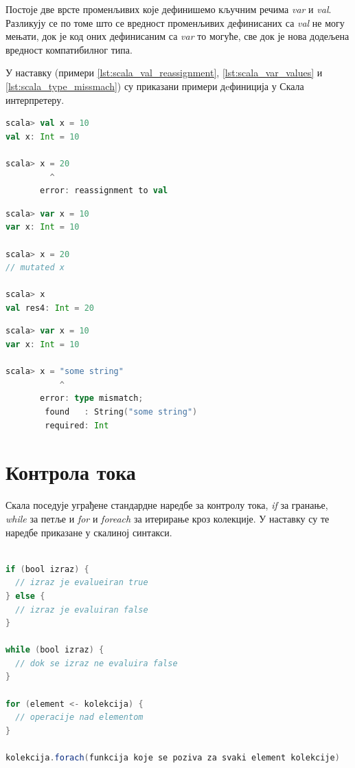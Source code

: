 \documentclass[12pt,oneside]{memoir}
\begin{document}
Постоје две врсте променљивих које дефинишемо кључним речима \textit{var} и \textit{val}. Разликују се по томе што се вредност променљивих дефинисаних са \textit{val} не могу мењати, док је код оних дефинисаним са \textit{var} то могуће, све док је нова додељена вредност компатибилног типа. \cite{scala_prog}

У наставку (примери \ref{lst:scala_val_reassignment}, \ref{lst:scala_var_values} и \ref{lst:scala_type_missmach}) су приказани примери дeфиниција у Скала интерпретеру.

\begin{lstlisting}[language=Scala, caption={Додељивање нове вредности val променљивима}, label={lst:scala_val_reassignment}]
scala> val x = 10
val x: Int = 10

scala> x = 20
         ^
       error: reassignment to val
\end{lstlisting}

\begin{lstlisting}[language=Scala, caption={Додељивање нове вредности var променљивима}, label={lst:scala_var_values}]
scala> var x = 10
var x: Int = 10

scala> x = 20
// mutated x

scala> x
val res4: Int = 20

\end{lstlisting}

\begin{lstlisting}[language=Scala, caption={Додељивање некомпатибилног типа}, label={lst:scala_type_missmach}]
scala> var x = 10
var x: Int = 10

scala> x = "some string"
           ^
       error: type mismatch;
        found   : String("some string")
        required: Int
\end{lstlisting}

\section{Контрола тока}
\label{sec:scala_kontr_toka}

Скала поседује уграђене стандардне наредбе за контролу тока, \textit{if} за гранање, \textit{while} за петље и \textit{for} и \textit{foreach} за итерирање кроз колекције. У наставку су те наредбе приказане у скалиној синтакси. \cite{scala_prog}

\begin{lstlisting}[language=Scala, caption={Контрола тока}, label={lst:scala_flow_control}]

if (bool izraz) {
  // izraz je evalueiran true
} else {
  // izraz je evaluiran false
}

while (bool izraz) {
  // dok se izraz ne evaluira false
}

for (element <- kolekcija) {
  // operacije nad elementom
}

kolekcija.forach(funkcija koje se poziva za svaki element kolekcije)

\end{lstlisting}
\end{document}
